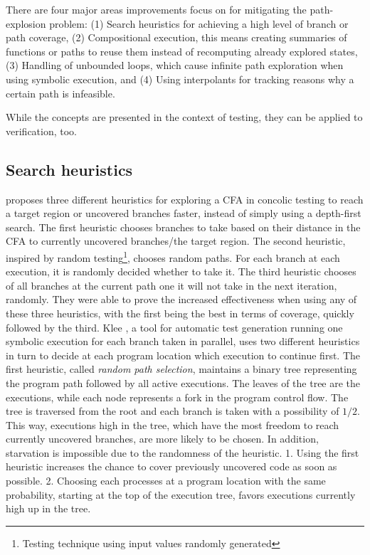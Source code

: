 There are four major areas improvements focus on for mitigating the path-explosion problem:
(1) Search heuristics for achieving a high level of branch or path coverage,
(2) Compositional execution, this means creating summaries of functions or paths to reuse them instead of recomputing already explored states,
(3) Handling of unbounded loops, which cause infinite path exploration when using symbolic execution, and
(4) Using interpolants for tracking reasons why a certain path is infeasible.


While the concepts are presented in the context of testing, they can be applied to verification, too.

\subsection*{Search heuristics}
\cite{Burnim2008} proposes three different heuristics for exploring a CFA in concolic testing to reach a target region or uncovered branches faster, instead of simply using a depth-first search.
The first heuristic chooses branches to take based on their distance in the CFA to currently uncovered branches/the target region.
The second heuristic, inspired by random testing\footnote{Testing technique using input values randomly generated}, chooses random paths.
For each branch at each execution, it is randomly decided whether to take it.
The third heuristic chooses of all branches at the current path one it will not take in the next iteration, randomly.
They were able to prove the increased effectiveness when using any of these three heuristics, with the first being the best in terms of coverage, quickly followed by the third.
Klee \cite{Cadar2008}, a tool for automatic test generation running one symbolic execution for each branch taken in parallel, uses two different heuristics in turn to decide at each program location which execution to continue first.
The first heuristic, called \emph{random path selection}, maintains a binary tree representing the program path followed by all active executions.
The leaves of the tree are the executions, while each node represents a fork in the program control flow.
The tree is traversed from the root and each branch is taken with a possibility of $1/2$.
This way, executions high in the tree, which have the most freedom to reach currently uncovered branches, are more likely to be chosen.
In addition, starvation is impossible due to the randomness of the heuristic.
1. Using the first heuristic increases the chance to cover previously uncovered code as soon as possible.
2. Choosing each processes at a program location with the same probability, starting at the top of the execution tree, favors executions currently high up in the tree.

